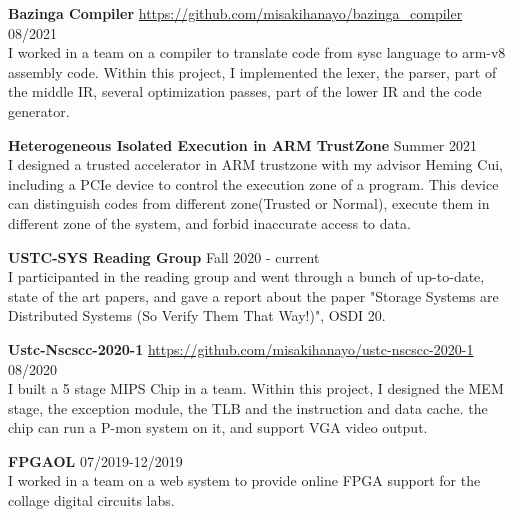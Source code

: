 \documentclass[margin, 10pt]{res}
\begin{document}
\begin{resume}
{\bf Bazinga Compiler} \url{https://github.com/misakihanayo/bazinga_compiler} \hfill 08/2021 \\
I worked in a team on a compiler to translate code from sysc language to arm-v8 assembly code.
Within this project, I implemented the lexer, the parser, part of the middle IR, several optimization passes, part of the lower IR and the code generator.

{\bf Heterogeneous Isolated Execution in ARM TrustZone}  \hfill Summer 2021 \\
I designed a trusted accelerator in ARM trustzone with my advisor Heming Cui, including a PCIe device to 
control the execution zone of a program. This device can distinguish codes from different zone(Trusted or Normal), 
execute them in different zone of the system, and forbid inaccurate access to data.

{\bf USTC-SYS Reading Group} Fall 2020 - current \\
I participanted in the reading group and went through a bunch of up-to-date, state of the art papers,
 and gave a report about the paper "Storage Systems are Distributed Systems (So Verify Them That Way!)", OSDI 20.

{\bf Ustc-Nscscc-2020-1} \url{https://github.com/misakihanayo/ustc-nscscc-2020-1} \hfill 08/2020 \\
I built a 5 stage MIPS Chip in a team. Within this project, I designed the MEM stage,
 the exception module, the TLB and the instruction and data cache. the chip can run a P-mon system on it, and support 
 VGA video output.

{\bf FPGAOL} \hfill 07/2019-12/2019 \\
I worked in a team on a web system to provide online FPGA support for the collage digital circuits labs.


\end{resume}
\end{document}

